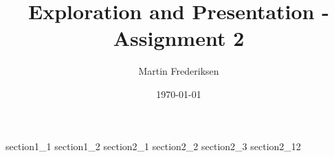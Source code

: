 \documentclass[10pt]{article}
\title{Exploration and Presentation - Assignment 2}
\author{Martin Frederiksen}
\date{\today}
\begin{document}
\hypersetup{pageanchor=false}
\begin{titlepage}
\maketitle
\end{titlepage}

{section1_1}
{section1_2}
{section2_1}
{section2_2}
{section2_3}
{section2_12}



\end{document}
